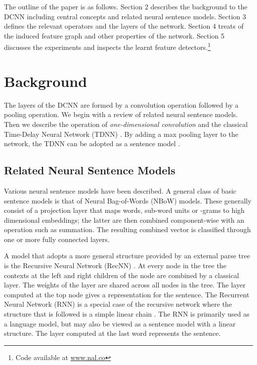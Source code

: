 \documentclass[11pt]{article}
\begin{document}
The outline of the paper is as follows. Section 2 describes the background to the DCNN including central concepts and related neural sentence models. Section 3 defines the relevant operators and the layers of the network. Section 4 treats of the induced feature graph and other properties of the network. Section 5 discusses the experiments and inspects the learnt feature detectors.\footnote{Code available at \url{www.nal.co}}

\section{Background}
\label{back}

The layers of the DCNN are formed by a convolution operation followed by a pooling operation. We begin with a review of related neural sentence models. Then we describe the operation of \emph{one-dimensional convolution} and the classical Time-Delay Neural Network (TDNN) \cite{DBLP:journals/ai/Hinton89,Waibel:1990:PRU:108235.108263}. By adding a max pooling layer to the network, the TDNN can be adopted as a sentence model \cite{collobert:2008}.

\subsection{Related Neural Sentence Models}
Various neural sentence models have been described. A general class of basic sentence models is that of Neural Bag-of-Words (NBoW) models. These generally consist of a projection layer that maps words, sub-word units or -grams  to high dimensional embeddings; the latter are then combined component-wise with an operation such as summation. The resulting combined vector is  classified through one or more fully connected layers.

A model that adopts a more general structure provided by an external parse tree is the Recursive Neural Network (RecNN) \cite{pollack:recursive,DBLP:conf/ki/KuchlerG96,SocherEtAl2011:RAE,hermann-blunsom:2013:ACL2013}. At every node in the tree the contexts at the left and right children of the node are combined by a classical layer. The weights of the layer are shared across all nodes in the tree. The layer computed at the top node gives a representation for the sentence. 
The Recurrent Neural Network (RNN) is a special case of the recursive network where the structure that is followed is a simple linear chain \cite{journals/tnn/GersS01,DBLP:conf/icassp/MikolovKBCK11}. The RNN is primarily used as a language model, but may also be viewed as a sentence model with a linear structure. The layer computed at the last word represents the sentence. 
\end{document}
